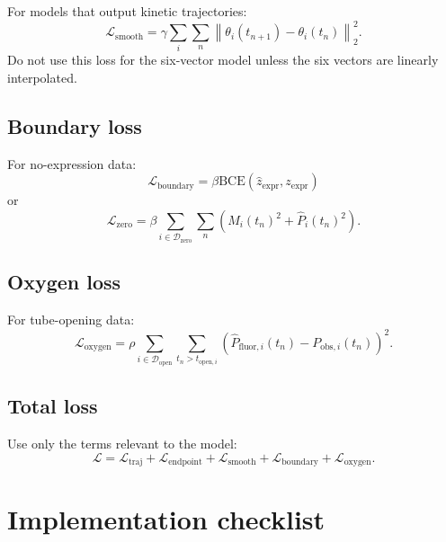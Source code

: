 \documentclass[11pt]{article}
\newcommand{\fluor}{\mathrm{fluor}}
\newcommand{\obs}{\mathrm{obs}}
\newcommand{\open}{\mathrm{open}}
\newcommand{\expr}{\mathrm{expr}}
\newcommand{\BCE}{\mathrm{BCE}}
\begin{document}
For models that output kinetic trajectories:
\begin{equation}
    \mathcal{L}_{\mathrm{smooth}}
    =
    \gamma
    \sum_i\sum_n
    \left\lVert \theta_i(t_{n+1})-\theta_i(t_n)\right\rVert_2^2.
\end{equation}
Do not use this loss for the six-vector model unless the six vectors are linearly interpolated.

\subsection{Boundary loss}

For no-expression data:
\begin{equation}
    \mathcal{L}_{\mathrm{boundary}}
    =
    \beta\BCE(\widehat{z}_{\expr},z_{\expr})
\end{equation}
or
\begin{equation}
    \mathcal{L}_{\mathrm{zero}}
    =
    \beta
    \sum_{i\in\mathcal{D}_{\mathrm{zero}}}\sum_n
    \left(\widehat{M}_i(t_n)^2+\widehat{P}_i(t_n)^2\right).
\end{equation}

\subsection{Oxygen loss}

For tube-opening data:
\begin{equation}
    \mathcal{L}_{\mathrm{oxygen}}
    =
    \rho
    \sum_{i\in\mathcal{D}_{\open}}
    \sum_{t_n>t_{\open,i}}
    \left(\widehat{P}_{\fluor,i}(t_n)-P_{\obs,i}(t_n)\right)^2.
\end{equation}

\subsection{Total loss}

Use only the terms relevant to the model:
\begin{equation}
    \mathcal{L}
    =
    \mathcal{L}_{\mathrm{traj}}
    +
    \mathcal{L}_{\mathrm{endpoint}}
    +
    \mathcal{L}_{\mathrm{smooth}}
    +
    \mathcal{L}_{\mathrm{boundary}}
    +
    \mathcal{L}_{\mathrm{oxygen}}.
\end{equation}

\section{Implementation checklist}
\end{document}
